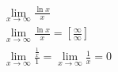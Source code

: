 \begin{ex}
\begin{align}
&\lim_{x\rightarrow \infty} \frac{\ln{x}}{x}\nonumber\\
&\lim_{x\rightarrow \infty} \frac{\ln{x}}{x}=\left[\frac{\infty}{\infty}\right]\nonumber\\
&\lim_{x\rightarrow \infty} \frac{\frac{1}{x}}{1}=\lim_{x\rightarrow \infty} \frac{1}{x}=0\nonumber
\end{align}
\end{ex}